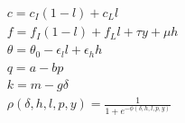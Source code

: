\begin{subequations}
\begin{align}
	&\qquad c = c_I(1-l)+c_Ll \label{eqBuyerMarginalCost2}\\
	&\qquad f = f_I(1-l)+f_Ll+\tau y+\mu h \label{eqBuyerFixedCost2}\\
	&\qquad \theta = \theta_0-\epsilon_l l  +\epsilon_h h \label{eqBuyerTheta2}\\
	&\qquad  q = a - bp \label{eqBuyerEnergyDemand2}\\	
	&\qquad  k = m -g \delta \label{eqBuyerCapacityDemand2}\\
	&\qquad	 \rho(\delta, h, l, p,y)=\frac{1}{1+e^{-\phi(\delta, h, l, p, y)}} \label{eqGeneratorProbability2}\\
	\end{align}
\end{subequations}

